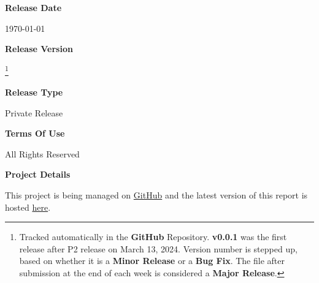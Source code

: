 \begin{titlepage}
{        \vspace{0.25cm}
        \textbf{\textcolor{tuberlindarkgray}{Release Date}}\par \vspace{0.125cm}
        {\today}

        \vspace{0.25cm}
        \textbf{\textcolor{tuberlindarkgray}{Release Version}}\par \vspace{0.125cm}
        \textbf{}\footnote{Tracked automatically in the \textbf{GitHub} Repository.
                  \textbf{v0.0.1} was the first release after P2 release on March 13, 2024.
                  Version number is stepped up, based on whether it is a \textbf{Minor Release} or a \textbf{Bug Fix}.
                  The file after submission at the end of each week is considered a \textbf{Major Release}.}

        \vspace{0.25cm}
        \textbf{\textcolor{tuberlindarkgray}{Release Type}}\par \vspace{0.125cm}
        {Private Release}

        \vspace{0.25cm}
        \textbf{\textcolor{tuberlindarkgray}{Terms Of Use}}\par \vspace{0.125cm}
        {All Rights Reserved}

        \vspace{0.25cm}
        \textbf{\textcolor{tuberlindarkgray}{Project Details}}\par \vspace{0.125cm}
        {This project is being managed on \href{https://github.com/ELP305-Cleaning-Machine}{GitHub} and the latest version of this report is hosted \href{https://2nav.github.io/TribeC/}{here}.}
    }
\end{titlepage}
\afterpage{\restoregeometry}    
